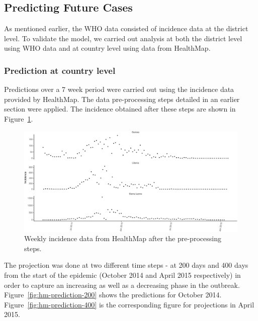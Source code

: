 \documentclass[11pt,]{article}
\begin{document}
\subsection{Predicting Future Cases}\label{predicting-future-cases}

As mentioned earlier, the WHO data consisted of incidence data at the district level. To
validate the model, we carried out analysis at both the district level
using WHO data and at country level using data from HealthMap.

\subsubsection{Prediction at country level}

Predictions over a 7 week period were carried out using the incidence
data provided by HealthMap. The data pre-processing steps detailed in
an earlier section were applied. The incidence obtained after these
steps are shown in Figure~\ref{fig:hm-incid}.

\begin{figure}
  \centering
  \includegraphics[]{ms6-figures/hm_weekly_incid-1}
  \caption{Weekly incidence data from HealthMap after the pre-processing
    steps.}
  \label{fig:hm-incid}
\end{figure}

The projection was done at two
different time steps - at 200 days and 400 days from the start of the
epidemic (October 2014 and April 2015
respectively) in order to capture an increasing as well as a
decreasing phase in the outbreak. Figure~\ref{fig:hm-prediction-200} shows the
predictions for October 2014. Figure~\ref{fig:hm-prediction-400} is
the corresponding figure for projections in April 2015.
\end{document}
